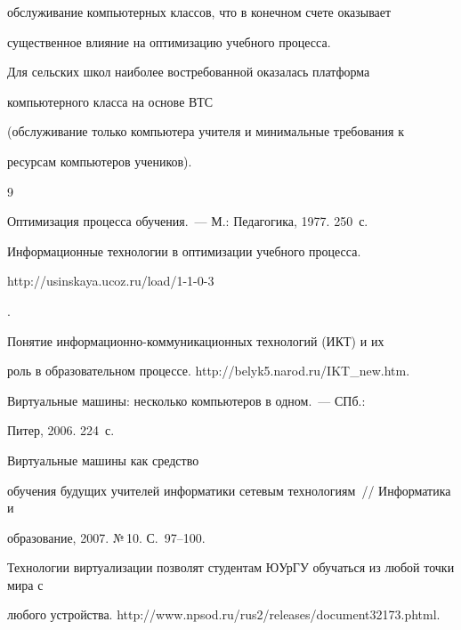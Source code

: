 обслуживание компьютерных классов, что в конечном счете оказывает 


существенное влияние на оптимизацию учебного процесса.





Для сельских школ наиболее востребованной оказалась платформа 


компьютерного класса на основе ВТС 


(обслуживание только компьютера учителя и минимальные требования к 


ресурсам компьютеров учеников).





{\small\frenchspacing


{%




\begin{thebibliography}{9}







 Оптимизация процесса обучения.~--- М.: Педагогика, 1977. 250~с.




 Информационные технологии в оптимизации учебного процесса. {\sf 


http://usinskaya.ucoz.ru/load/1-1-0-3}. 




 Понятие информационно-коммуникационных технологий (ИКТ) и их 


роль в образовательном процессе. {\sf http://belyk5.narod.ru/IKT\_new.htm}.




 Виртуальные машины: несколько компьютеров в одном.~--- СПб.: 


Питер, 2006. 224~с. 





    \label{end\stat}


    




 Виртуальные машины как средство 


обучения будущих учителей информатики сетевым технологиям~/\!\!/ Информатика и 


образование, 2007. №\,10. С.~97--100.




Технологии виртуализации позволят студентам ЮУрГУ обучаться из любой точки мира с 


любого устройства. {\sf http://www.npsod.ru/rus2/releases/document32173.\linebreak phtml}.


 \end{thebibliography}


}


}


